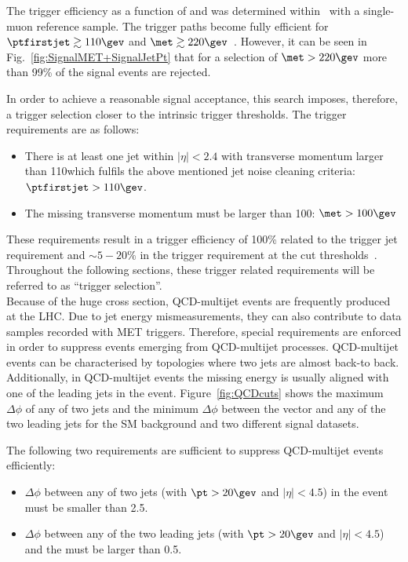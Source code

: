 The trigger efficiency as a function of \met and \ptfirstjet was determined within~\cite{bib:CMS:DM_8TeV} with a single-muon reference sample.
The trigger paths become fully efficient for $\ptfirstjet \gtrsim 110\gev$ and $\met \gtrsim 220\gev$~\cite{bib:CMS:DM_8TeV_AN}.
However, it can be seen in Fig.~\ref{fig:SignalMET+SignalJetPt} that for a selection of \mbox{$\met>220\gev$} more than 99\% of the signal events are rejected.

In order to achieve a reasonable signal acceptance, this search imposes, therefore, a trigger selection closer to the intrinsic trigger thresholds.
The trigger requirements are as follows:
\begin{itemize}
\renewcommand{\labelitemi}{\footnotesize{\ding{118}}}
\item There is at least one jet within $|\eta|<2.4$ with transverse momentum larger than 110\gev which fulfils the above mentioned jet noise cleaning criteria: \mbox{$\ptfirstjet>110\gev$}.
\item The missing transverse momentum must be larger than 100\gev: \mbox{$\met>100\gev$}
\end{itemize}
These requirements result in a trigger efficiency of 100\% related to the trigger jet \pt requirement and $\sim5-20\%$ in the trigger \met requirement at the cut thresholds~\cite{bib:CMS:DM_8TeV_AN}.
Throughout the following sections, these trigger related requirements will be referred to as ``trigger selection''.\\  %

Because of the huge cross section, QCD-multijet events are frequently produced at the LHC.
Due to jet energy mismeasurements, they can also contribute to data samples recorded with MET triggers.
Therefore, special requirements are enforced in order to suppress events emerging from QCD-multijet processes.
QCD-multijet events can be characterised by topologies where two jets are almost back-to back.
Additionally, in QCD-multijet events the missing energy is usually aligned with one of the leading jets in the event.
Figure~\ref{fig:QCDcuts} shows the maximum $\Delta\phi$ of any of two jets and the minimum $\Delta\phi$ between the \met vector and any of the two leading jets for the SM background and two different signal datasets.

The following two requirements are sufficient to suppress QCD-multijet events efficiently:
\begin{itemize}
\renewcommand{\labelitemi}{\footnotesize{\ding{118}}}
\item $\Delta\phi$ between any of two jets (with $\pt>20\gev$ and $|\eta|<4.5$) in the event must be smaller than 2.5. %
\item $\Delta\phi$ between any of the two leading jets (with $\pt>20\gev$ and $|\eta|<4.5$) and the \met must be larger than 0.5. %
\end{itemize}

